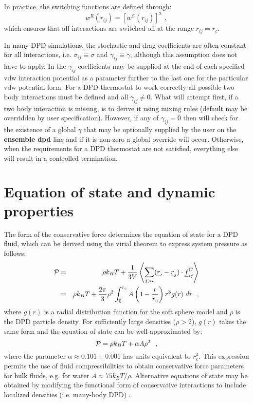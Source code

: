In practice, the switching functions are defined through:
\begin{equation}
w^{R}(r_{ij}) = \left[w^{C}(r_{ij})\right]^{2}~~,
\end{equation}
which ensures that all interactions are switched off at the range $r_{ij} = r_{c}$.

In many DPD simulations, the stochastic and drag coefficients are often constant
for all interactions, i.e. $\sigma_{ij} \equiv \sigma$ and $\gamma_{ij} \equiv \gamma$,
although this assumption does not have to apply.  In \D the $\gamma_{ij}$ coefficients
may be supplied at the end of each specified vdw interaction potential as a parameter
further to the last one for the particular vdw potential form.  For a DPD thermostat to
work correctly all possible two body interactions must be defined and all $\gamma_{ij} \ne 0$.
What \D will attempt first, if a two body interaction is missing, is to derive it using
mixing rules (default may be overridden by user specification).  However, if any of
$\gamma_{ij} = 0$ then \D will check for the existence of a global $\gamma$ that may
be optionally supplied by the user on the {\bf ensemble dpd} line and if it is non-zero
a global override will occur.  Otherwise, when the requirements for a DPD thermostat are
not satisfied, everything else will result in a controlled termination.

\section{Equation of state and dynamic properties}

The form of the conservative force determines the equation of state for a DPD fluid,
which can be derived using the virial theorem to express system pressure as follows:
\begin{eqnarray}
{\cal P} &=& \rho k_{B}T + \frac{1}{3V} \left\langle \sum_{j>i} (\mbox{$\underline{r}$}_i-\mbox{$\underline{r}$}_j) \cdot \mbox{$\underline{f}$}_{ij}^{C} \right\rangle \\
  &=& \rho k_{B} T + \frac{2 \pi}{3} \rho^{2} \int_{0}^{r_{c}} A \left( 1 - \frac{r}{r_{c}} \right) r^{3} g(r)~dr~~,
\end{eqnarray}
where $g(r)$ is a radial distribution function for the soft sphere model \cite{groot-97a}
and $\rho$ is the DPD particle density.  For sufficiently large densities ($\rho > 2$),
$g(r)$ takes the same form and the equation of state can be well-approximated by:
\begin{equation}
{\cal P} = \rho k_{B}T + \alpha A \rho^{2}~~,
\end{equation}
where the parameter $\alpha \approx 0.101 \pm 0.001$ has units equivalent to $r_{c}^{4}$.
This expression permits the use of fluid compressibilities to obtain conservative force
parameters for bulk fluids, e.g. for water $A \approx 75 k_{B} T/\rho$.  Alternative
equations of state may be obtained by modifying the functional form of conservative
interactions to include localized densities (i.e. many-body DPD) \cite{pagonabarraga-01a,trofimov-02a}.

